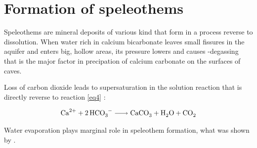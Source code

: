\section{Formation of speleothems}

Speleothems are mineral deposits of various kind that form in a process reverse
to dissolution. When water rich in calcium bicarbonate leaves small fissures in
the aquifer and enters big, hollow areas, its pressure lowers and causes
-degassing that is the major factor in precipation of calcium carbonate
on the surfaces of caves.

Loss of carbon dioxide leads to supersaturation in the solution reaction that
is directly reverse to reaction \ref{eq4} \parencite{fairchild2012speleothem}:

\begin{equation}
  \ce{Ca^2+ + 2HCO3^- -> CaCO3 + H2O + CO2}
  \label{eq:precipation}
\end{equation}

Water evaporation plays marginal role in speleothem formation, what was shown
by \cite{holland1964cave}.

